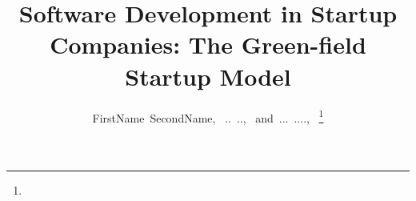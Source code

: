 \documentclass[10pt,journal,letterpaper,compsoc]{IEEEtran}
\begin{document}
%
\title{Software Development in Startup Companies: The Green-field Startup Model}
%
%
%
%

\author{FirstName~SecondName,~
        ..~..,~
        and~...~....,~%
\thanks{}}

% 
%
\end{document}
